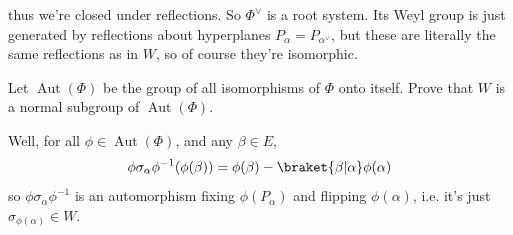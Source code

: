\documentclass[11pt, headheight=30pt]{scrartcl}
\DeclareMathOperator{\Aut}{Aut}
\begin{document}
thus we're closed under reflections. So $\Phi^\vee$ is a root system.
Its Weyl group is just generated by reflections about hyperplanes $P_\alpha = P_{\alpha^\vee}$,
but these are literally the same reflections as in $W$, so of course they're isomorphic.
\begin{prob}
    Let $\Aut(\Phi)$ be the group of all isomorphisms of $\Phi$ onto itself. Prove that $W$ is a
    normal subgroup of $\Aut(\Phi)$.
\end{prob}
Well, for all $\phi \in \Aut(\Phi)$, and any $\beta\in E$,
\[
    \phi\sigma_\alpha \phi^{-1}(\phi(\beta)) = \phi(\beta) - \braket{\beta | \alpha}\phi(\alpha) 
\]
so $\phi\sigma_\alpha \phi^{-1}$ is an automorphism fixing $\phi(P_\alpha)$
and flipping $\phi(\alpha)$, i.e. it's just $\sigma_{\phi(\alpha)}\in W$.
\end{document}
